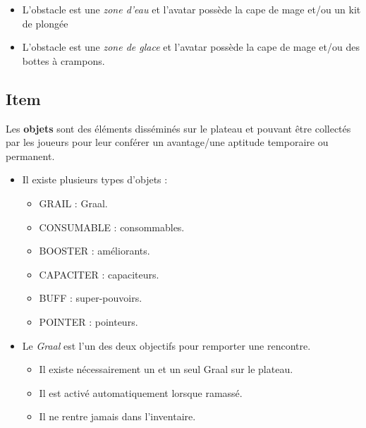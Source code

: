 \begin{itemize}
\begin{itemize}
            \item L'obstacle est une \textit{zone d'eau} et l'avatar possède la cape de mage et/ou un kit de plongée
            \item L'obstacle est une \textit{zone de glace} et l'avatar possède la cape de mage et/ou des bottes à crampons.
        \end{itemize}
    \end{itemize}

\subsection{Item}
Les \textbf{objets} sont des éléments disséminés sur le plateau et pouvant être collectés par les joueurs pour leur conférer un avantage/une aptitude temporaire ou permanent.
\begin{itemize}
    \item Il existe plusieurs types d'objets :
        \begin{itemize}
            \item GRAIL : Graal.
            \item CONSUMABLE : consommables.
            \item BOOSTER : améliorants.
            \item CAPACITER : capaciteurs.
            \item BUFF : super-pouvoirs.
            \item POINTER : pointeurs.
        \end{itemize}

        \item Le \textit{Graal} est l'un des deux objectifs pour remporter une rencontre. 
            \begin{itemize}
                \item Il existe nécessairement un et un seul Graal sur le plateau.
                \item Il est activé automatiquement lorsque ramassé.
                \item Il ne rentre jamais dans l'inventaire.
            \end{itemize}
        

\end{itemize}
